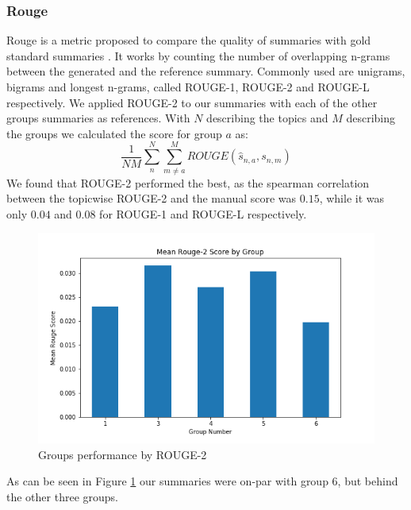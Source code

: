\subsubsection{Rouge}
Rouge is a metric proposed to compare the quality of summaries with gold standard summaries \cite{lin2004rouge}. It works by counting the number of overlapping n-grams between the generated and the reference summary. Commonly used are unigrams, bigrams and longest n-grams, called ROUGE-1, ROUGE-2 and ROUGE-L respectively. We applied ROUGE-2 to our summaries with each of the other groups summaries as references. With $N$ describing the topics and $M$ describing the groups we calculated the score for group $a$ as:
$$\frac{1}{NM} \sum^N_{n} \sum^M_{m\neq a} ROUGE(\hat{s}_{n,a}, s_{n,m}) $$
We found that ROUGE-2 performed the best, as the spearman correlation between the topicwise ROUGE-2 and the manual score was $0.15$, while it was only $0.04$ and $0.08$ for ROUGE-1 and ROUGE-L respectively.

\begin{figure}[!ht]
	\centering
	\includegraphics[width=0.55\linewidth]{../evaluation/meanrouge.png}
	\caption{Groups performance by ROUGE-2}
	\label{fig:rouge}
\end{figure}

As can be seen in Figure \ref{fig:rouge} our summaries were on-par with group 6, but behind the other three groups. 